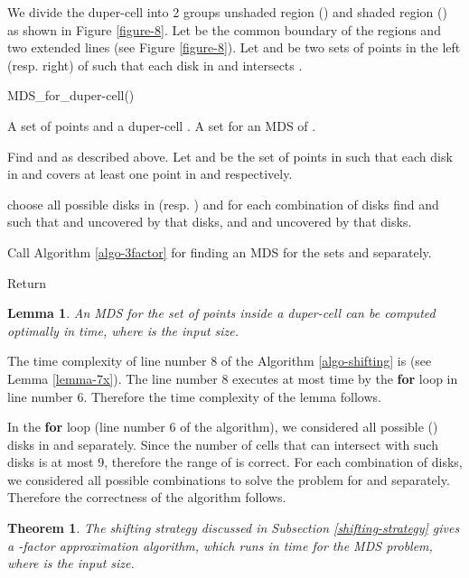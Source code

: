 \documentclass[a4paper,11pt]{article}
\newtheorem{theorem}{Theorem}
\newtheorem{lemma}{Lemma}
\newenvironment{proof}{\noindent {\bf Proof:\,\ }}{\hfill\mbox{\
}\smallskip}
\begin{document}
We divide the duper-cell  into 2 groups  unshaded region () and shaded region () as shown in 
Figure \ref{figure-8}. Let  be the common boundary of the regions and two extended lines 
(see Figure \ref{figure-8}). Let  and  be two sets of points in the left (resp. right) of  such 
that each disk in  and  intersects . 

\begin{algorithm}[!ht]
\caption{MDS\_for\_duper-cell()}
\begin{algorithmic}[1]
 A set  of  points and a duper-cell .
 A set  for an MDS of .

\STATE Find  and  as described above. 
\STATE Let  and  be the set of points in  such that each 
disk in  and  covers at least one point in  and 
 respectively. 

\STATE 
\FOR {()}
  \STATE choose all possible  disks in  (resp. ) and for each combination 
  of  disks find  and  such that  and uncovered by that  disks, 
  and  and uncovered by that  disks.
  
  \STATE Call Algorithm \ref{algo-3factor} for finding an MDS for the sets  and  separately.

\ENDFOR
\STATE Return 
\end{algorithmic}
\label{algo-shifting}
\end{algorithm}

\begin{lemma} \label{lemma-9x}
An MDS for the set of points inside a duper-cell  can be computed optimally 
in  time, where  is the input size.
\end{lemma}

\begin{proof}
 The time complexity of line number 8 of the Algorithm \ref{algo-shifting} is  
 (see Lemma \ref{lemma-7x}). The line number 8 executes at most  time by the {\bf for} loop 
 in line number 6. Therefore the time complexity of the lemma follows.
 
 In the {\bf for} loop (line number 6 of the algorithm), we considered 
 all possible  () disks in  and  separately. Since 
 the number of cells that can intersect with such  disks is at most 9, therefore the range of  is correct. 
 For each combination of  disks, we considered all possible combinations to solve the problem 
 for  and  separately. Therefore the correctness of the algorithm follows. 
\end{proof}


\begin{theorem} \label{theorem-3y}
The shifting strategy discussed in Subsection \ref{shifting-strategy} gives a -factor 
approximation algorithm, which runs in  time for the MDS problem, where  is the 
input size.
\end{theorem}
\end{document}
